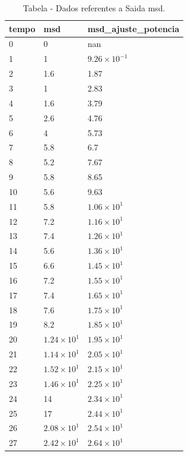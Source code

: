 \begin{table}[H]
\centering
\caption{Tabela - Dados referentes a Saida msd.}
\label{tab:saida_msd}
\begin{tabular}{lll}
\toprule
tempo & msd & msd\_ajuste\_potencia \\
\midrule
0 & 0 & nan \\
1 & 1 & $\displaystyle 9.26 \times 10^{-1}$ \\
2 & 1.6 & 1.87 \\
3 & 1 & 2.83 \\
4 & 1.6 & 3.79 \\
5 & 2.6 & 4.76 \\
6 & 4 & 5.73 \\
7 & 5.8 & 6.7 \\
8 & 5.2 & 7.67 \\
9 & 5.8 & 8.65 \\
10 & 5.6 & 9.63 \\
11 & 5.8 & $\displaystyle 1.06 \times 10^{1}$ \\
12 & 7.2 & $\displaystyle 1.16 \times 10^{1}$ \\
13 & 7.4 & $\displaystyle 1.26 \times 10^{1}$ \\
14 & 5.6 & $\displaystyle 1.36 \times 10^{1}$ \\
15 & 6.6 & $\displaystyle 1.45 \times 10^{1}$ \\
16 & 7.2 & $\displaystyle 1.55 \times 10^{1}$ \\
17 & 7.4 & $\displaystyle 1.65 \times 10^{1}$ \\
18 & 7.6 & $\displaystyle 1.75 \times 10^{1}$ \\
19 & 8.2 & $\displaystyle 1.85 \times 10^{1}$ \\
20 & $\displaystyle 1.24 \times 10^{1}$ & $\displaystyle 1.95 \times 10^{1}$ \\
21 & $\displaystyle 1.14 \times 10^{1}$ & $\displaystyle 2.05 \times 10^{1}$ \\
22 & $\displaystyle 1.52 \times 10^{1}$ & $\displaystyle 2.15 \times 10^{1}$ \\
23 & $\displaystyle 1.46 \times 10^{1}$ & $\displaystyle 2.25 \times 10^{1}$ \\
24 & 14 & $\displaystyle 2.34 \times 10^{1}$ \\
25 & 17 & $\displaystyle 2.44 \times 10^{1}$ \\
26 & $\displaystyle 2.08 \times 10^{1}$ & $\displaystyle 2.54 \times 10^{1}$ \\
27 & $\displaystyle 2.42 \times 10^{1}$ & $\displaystyle 2.64 \times 10^{1}$ \\

\end{tabular}
\end{table}
